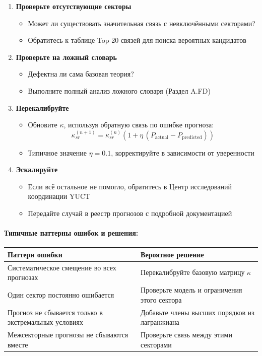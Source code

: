 \documentclass[11pt,a4paper]{article}
\begin{document}
\begin{enumerate}
		\item \textbf{Проверьте отсутствующие секторы}
		\begin{itemize}
			\item Может ли существовать значительная связь с невключёнными секторами?
			\item Обратитесь к таблице Top 20 связей для поиска вероятных кандидатов
		\end{itemize}
		
		\item \textbf{Проверьте на ложный словарь}
		\begin{itemize}
			\item Дефектна ли сама базовая теория?
			\item Выполните полный анализ ложного словаря (Раздел A.FD)
		\end{itemize}
		
		\item \textbf{Перекалибруйте}
		\begin{itemize}
			\item Обновите $\kappa$, используя обратную связь по ошибке прогноза:
			\[
			\kappa_{sr}^{(n+1)} = \kappa_{sr}^{(n)}\left(1+\eta\,(P_{\mathrm{actual}}-P_{\mathrm{predicted}})\right)
			\]
			\item Типичное значение $\eta = 0.1$, корректируйте в зависимости от уверенности
		\end{itemize}
		
		\item \textbf{Эскалируйте}
		\begin{itemize}
			\item Если всё остальное не помогло, обратитесь в Центр исследований координации YUCT
			\item Передайте случай в реестр прогнозов с подробной документацией
		\end{itemize}
	\end{enumerate}
	
	\paragraph*{Типичные паттерны ошибок и решения:}
	
	\begin{tabularx}{\textwidth}{|l|X|}
		\hline
		\textbf{Паттерн ошибки} & \textbf{Вероятное решение} \\
		\hline
		Систематическое смещение во всех прогнозах & Перекалибруйте базовую матрицу $\kappa$ \\
		\hline
		Один сектор постоянно ошибается & Проверьте модель и ограничения этого сектора \\
		\hline
		Прогноз не сбывается только в экстремальных условиях & Добавьте члены высших порядков из лагранжиана \\
		\hline
		Межсекторные прогнозы не сбываются вместе & Проверьте связь между этими секторами \\
		\hline
	\end{tabularx}
	
\end{document}

